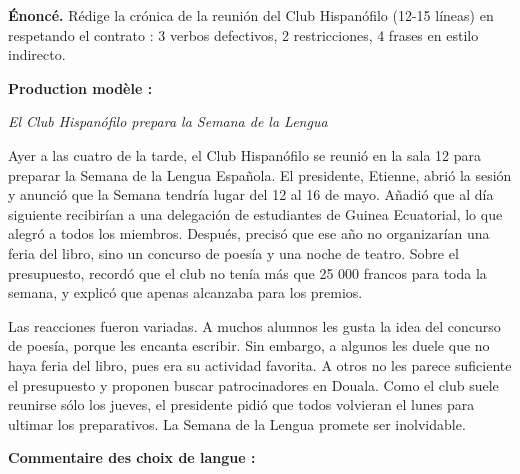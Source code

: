 \documentclass[11pt]{article}
\begin{document}
\begin{exoresolu}
\textbf{Énoncé.} Rédige la crónica de la reunión del Club Hispanófilo (12-15 líneas) en respetando el contrato : 3 verbos defectivos, 2 restricciones, 4 frases en estilo indirecto.

\tcblower

\textbf{Production modèle :}

\emph{El Club Hispanófilo prepara la Semana de la Lengua}

Ayer a las cuatro de la tarde, el Club Hispanófilo se reunió en la sala 12 para preparar la Semana de la Lengua Española. El presidente, Etienne, abrió la sesión y anunció que la Semana tendría lugar del 12 al 16 de mayo. Añadió que al día siguiente recibirían a una delegación de estudiantes de Guinea Ecuatorial, lo que alegró a todos los miembros. Después, precisó que ese año no organizarían una feria del libro, sino un concurso de poesía y una noche de teatro. Sobre el presupuesto, recordó que el club no tenía más que 25 000 francos para toda la semana, y explicó que apenas alcanzaba para los premios.

Las reacciones fueron variadas. A muchos alumnos les gusta la idea del concurso de poesía, porque les encanta escribir. Sin embargo, a algunos les duele que no haya feria del libro, pues era su actividad favorita. A otros no les parece suficiente el presupuesto y proponen buscar patrocinadores en Douala. Como el club suele reunirse sólo los jueves, el presidente pidió que todos volvieran el lunes para ultimar los preparativos. La Semana de la Lengua promete ser inolvidable.

\textbf{Commentaire des choix de langue :}


\end{exoresolu}
\end{document}
